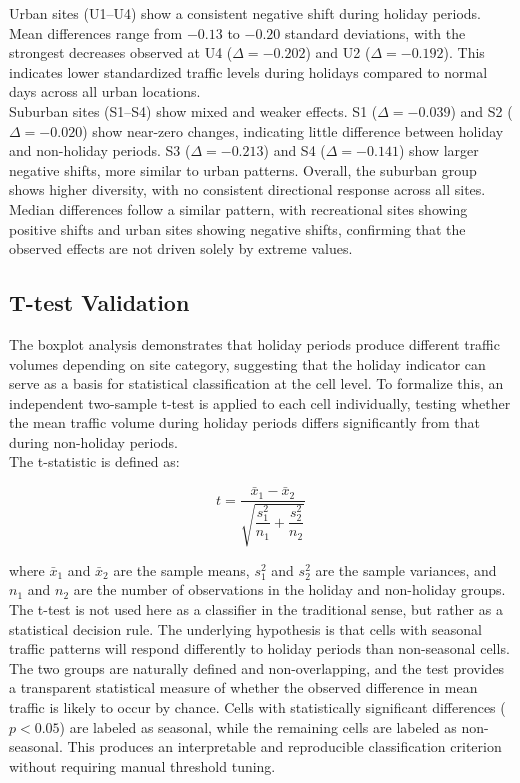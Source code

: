 Urban sites (U1--U4) show a consistent negative shift during holiday periods. Mean differences range from $-0.13$ to $-0.20$ standard deviations, with the strongest decreases observed at U4 ($\Delta = -0.202$) and U2 ($\Delta = -0.192$). This indicates lower standardized traffic levels during holidays compared to normal days across all urban locations. \\

Suburban sites (S1--S4) show mixed and weaker effects. S1 ($\Delta = -0.039$) and S2 ($\Delta = -0.020$) show near-zero changes, indicating little difference between holiday and non-holiday periods. S3 ($\Delta = -0.213$) and S4 ($\Delta = -0.141$) show larger negative shifts, more similar to urban patterns. Overall, the suburban group shows higher diversity, with no consistent directional response across all sites. \\

Median differences follow a similar pattern, with recreational sites showing positive shifts and urban sites showing negative shifts, confirming that the observed effects are not driven solely by extreme values. \\

\subsection{T-test Validation}
The boxplot analysis demonstrates that holiday periods produce different traffic volumes depending on site category, suggesting that the holiday indicator can serve as a basis for statistical classification at the cell level. To formalize this, an independent two-sample t-test is applied to each cell individually, testing whether the mean traffic volume during holiday periods differs significantly from that during non-holiday periods. \\

The t-statistic is defined as:

\begin{equation}
    t = \frac{\bar{x}_1 - \bar{x}_2}{\sqrt{\dfrac{s_1^2}{n_1} + \dfrac{s_2^2}{n_2}}}
    \label{eq:ttest}
\end{equation}

where $\bar{x}_1$ and $\bar{x}_2$ are the sample means, $s_1^2$ and $s_2^2$ are the sample variances, and $n_1$ and $n_2$ are the number of observations in the holiday and non-holiday groups. \\

The t-test is not used here as a classifier in the traditional sense, 
but rather as a statistical decision rule. The underlying hypothesis 
is that cells with seasonal traffic patterns will respond differently 
to holiday periods than non-seasonal cells. The two groups are 
naturally defined and non-overlapping, and the test provides a 
transparent statistical measure of whether the observed difference 
in mean traffic is likely to occur by chance. Cells with statistically 
significant differences ($p < 0.05$) are labeled as seasonal, while 
the remaining cells are labeled as non-seasonal. This produces an 
interpretable and reproducible classification criterion without 
requiring manual threshold tuning.  \\

